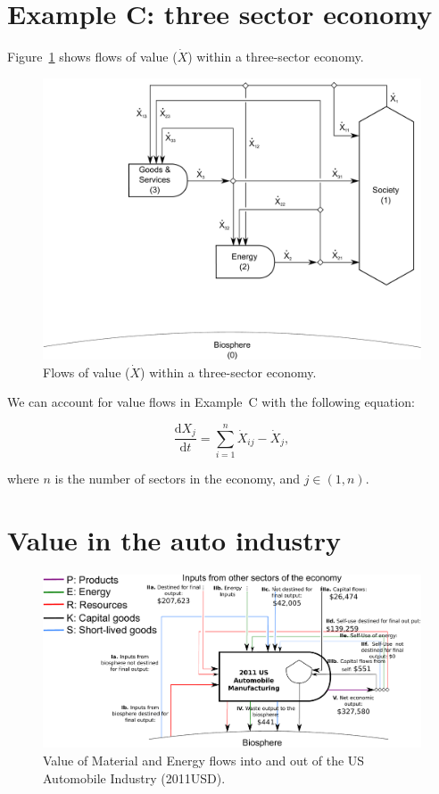 \section{Example C: three sector economy}

Figure~\ref{fig:C_value} shows flows of value ($\dot{X}$) 
within a three-sector economy. 

\begin{figure}[h!]
\centering
\includegraphics[width=0.8\linewidth]{Part_3/Chapter_Values/images/3_sector_value.pdf}
\caption{Flows of value ($\dot{X}$) within a three-sector economy.}
\label{fig:C_value}
\end{figure}

We can account for value flows in Example~C with the following equation:

\begin{equation}
	\frac{\mathrm{d}X_{j}}{\mathrm{d}t}
	= \sum\limits_{i=1}^{n} \dot{X}_{ij}
	- \dot{X}_{j},
\end{equation}

\noindent where $n$ is the number of sectors in the economy, and $j \in (1, n)$.


\section{Value in the auto industry}
\label{sec:value_auto}

\begin{figure}[h!]
\centering
\includegraphics[width=1.0\linewidth]{Part_3/Chapter_Values/images/PERKS_basic_unit_value_auto_ind.pdf}
\caption{Value of Material and Energy flows into and out of the US Automobile Industry (2011USD).}
\label{fig:PERKS_value_auto_ind}
\end{figure}


